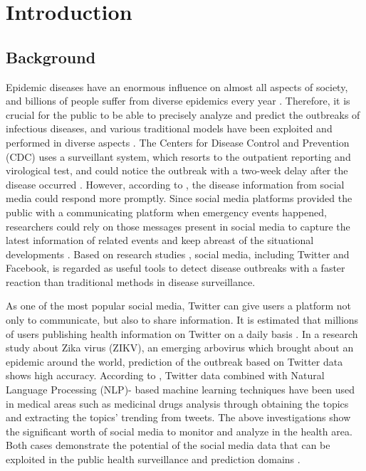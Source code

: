 \chapter{Introduction}
\label{ch:introduction}
\section{Background}

Epidemic diseases have an enormous influence on almost all aspects of society, and billions of people suffer from diverse epidemics every year \cite{zhang2017dynamics}. Therefore, it is crucial for the public to be able to precisely analyze and predict the outbreaks of infectious diseases, and various traditional models have been exploited and performed in diverse aspects \cite{ray2018prediction}. The Centers for Disease Control and Prevention (CDC) uses a surveillant system, which resorts to the outpatient reporting and virological test, and could notice the outbreak with a two-week delay after the disease occurred \cite{shmidt2012using}. However, according to \cite{shmidt2012using}, the disease information from social media could respond more promptly. 
Since social media platforms provided the public with a communicating platform when emergency events happened, researchers could rely on those messages present in social media to capture the latest information of related events and keep abreast of the situational developments \cite{imran2015processing}. Based on research studies \cite{charles2015using}, social media, including Twitter and Facebook, is regarded as useful tools to detect disease outbreaks with a faster reaction than traditional methods in disease surveillance. 

As one of the most popular social media, Twitter can give users a platform not only to communicate, but also to share information. It is estimated that millions of users publishing health information on Twitter on a daily basis \cite{fernandez2015health}. In a research study about Zika virus (ZIKV), an emerging arbovirus which brought about an epidemic around the world, prediction of the outbreak based on Twitter data shows high accuracy. According to \cite{kagashe2017enhancing}, Twitter data combined with Natural Language Processing (NLP)- based machine learning techniques have been used in medical areas such as medicinal drugs analysis through obtaining the topics and extracting the topics’ trending from tweets. The above investigations show the significant worth of social media to monitor and analyze in the health area. Both cases demonstrate the potential of the social media data that can be exploited in the public health surveillance and prediction domains \cite{masri2019use}. 

